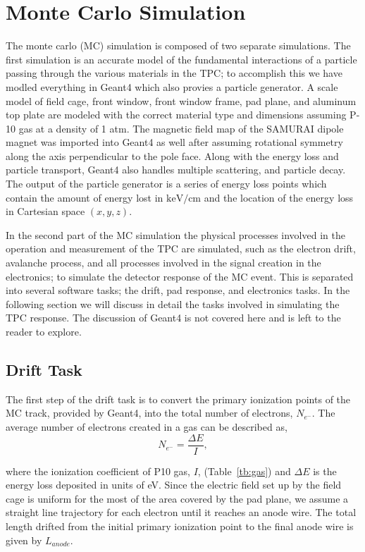 \section{Monte Carlo Simulation}
The monte carlo (MC) simulation is composed of two separate simulations. The first simulation is an accurate model of the fundamental interactions of a particle passing through the various materials in the TPC; to accomplish this we have modled everything in Geant4 which also provies a particle generator. A scale model of field cage, front window, front window frame, pad plane, and aluminum top plate are modeled with the correct material type and dimensions assuming P-10 gas at a density of 1 atm. The magnetic field map of the SAMURAI dipole magnet was imported into Geant4 as well after assuming rotational symmetry along the axis perpendicular to the pole face. Along with the energy loss and particle transport, Geant4 also handles multiple scattering, and particle decay. The output of the particle generator is a series of energy loss points which contain the amount of energy lost in $\si{\kilo\electronvolt\per\centi\metre}$ and the location of the energy loss in Cartesian space $(x,y,z)$. 

In the second part of the MC simulation the physical processes involved in the operation and measurement of the TPC are simulated, such as the electron drift, avalanche process, and all processes involved in the signal creation in the electronics; to simulate the detector response of the MC event. This is separated into several software tasks; the drift, pad response, and electronics tasks. In the following section we will discuss in detail the tasks involved in simulating the TPC response. The discussion of Geant4 is not covered here and is left to the reader to explore.  

\subsection{Drift Task}
 The first step of the drift task is to convert the primary ionization points of the MC track, provided by Geant4, into the total number of electrons, $N_{e^-}$. The average number of electrons created in a gas can be described as,
\begin{equation}
N_{e^{-}} =  \frac{\Delta E}{I},
\label{eq:kev2el}
\end{equation}
 
where the ionization coefficient of P10 gas, $I$, (Table~\ref{tb:gas}) and $\Delta E$ is the energy loss deposited in units of \si{\electronvolt}. Since the electric field set up by the field cage is uniform for the most of the area covered by the pad plane, we assume a straight line trajectory for each electron until it reaches an anode wire. The total length drifted from the initial primary ionization point to the final anode wire is given by $L_{anode}$. 

